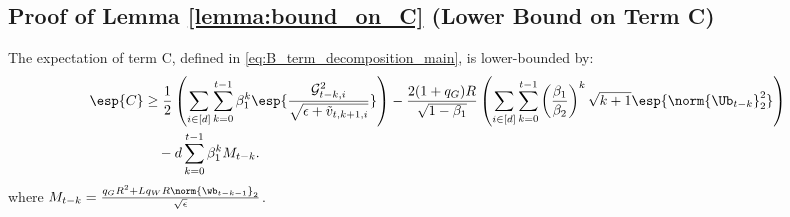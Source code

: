 \documentclass[11pt, letterpaper]{article}
\begin{document}
\subsection{Proof of Lemma \ref{lemma:bound_on_C} (Lower Bound on Term C)}
\begin{lemma}
\label{lemma:bound_on_C}
The expectation of term C, defined in \eqref{eq:B_term_decomposition_main}, is lower-bounded by:
\begin{align}
\nonumber
    \esp{C} &\geq \frac{1}{2}\left(\sum_{i\in [d]} \sum_{k=0}^{t-1}\beta_1^k\esp{\frac{\mathcal{G}_{t - k, i}^2}{\sqrt{\epsilon+\tilde{v}_{t, k+1, i}}}}\right) -
    \frac{2 (1+q_G)R}{\sqrt{1 - \beta_1}}\left(\sum_{i\in [d]} \sum_{k=0}^{t-1}
     \left(\frac{\beta_1}{\beta_2}\right)^k \sqrt{k+1} \esp{\norm{\Ub_{t -k}}_2^2}\right)\\
     &\quad-d\sum_{k=0}^{t-1}\beta_1^kM_{t-k}.
\end{align}
where $M_{t-k} = \frac{q_GR^2+Lq_WR\norm{\wb_{t-k-1}}_2}{\sqrt{\epsilon}}$.
\end{lemma}
\end{document}
